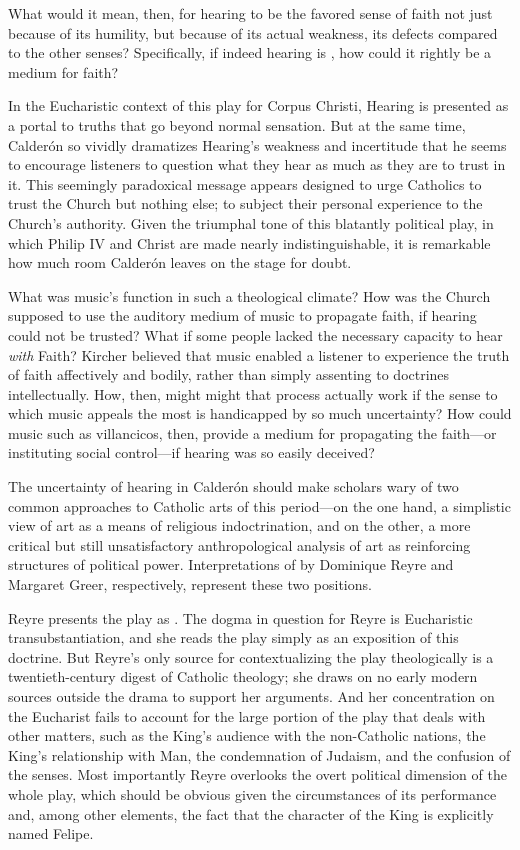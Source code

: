 What would it mean, then, for hearing to be the favored sense of faith not just because of its humility, but because of its actual weakness, its defects compared to the other senses?
Specifically, if indeed hearing is , how could it rightly be a medium for faith?

In the Eucharistic context of this play for Corpus Christi, Hearing is presented as a portal to truths that go beyond normal sensation.
But at the same time, Calderón so vividly dramatizes Hearing's weakness and incertitude that he seems to encourage listeners to question what they hear as much as they are to trust in it.
This seemingly paradoxical message appears designed to urge Catholics to trust the Church but nothing else; to subject their personal experience to the Church's authority.
Given the triumphal tone of this blatantly political play, in which Philip IV and Christ are made nearly indistinguishable, it is remarkable how much room Calderón leaves on the stage for doubt.

What was music's function in such a theological climate?
How was the Church supposed to use the auditory medium of music to propagate faith, if hearing could not be trusted?
What if some people lacked the necessary capacity to hear  \emph{with} Faith?
Kircher believed that music enabled a listener to experience the truth of faith affectively and bodily, rather than simply assenting to doctrines intellectually.
How, then, might might that process actually work if the sense to which music appeals the most is handicapped by so much uncertainty?  
How could music such as villancicos, then, provide a medium for propagating the faith---or instituting social control---if hearing was so easily deceived?

The uncertainty of hearing in Calderón should make scholars wary of two common approaches to Catholic arts of this period---on the one hand, a simplistic view of art as a means of religious indoctrination, and on the other, a more critical but still unsatisfactory anthropological analysis of art as reinforcing structures of political power.
Interpretations of  by Dominique Reyre and Margaret Greer, respectively, represent these two positions.%
  \autocites{Reyre:Retiro}{Greer:Retiro}

Reyre presents the play as .
The dogma in question for Reyre is Eucharistic transubstantiation, and she reads the play simply as an exposition of this doctrine.
But Reyre's only source for contextualizing the play theologically is a twentieth-century digest of Catholic theology; she draws on no early modern sources outside the drama to support her arguments.
And her concentration on the Eucharist fails to account for the large portion of the play that deals with other matters, such as the King's audience with the non-Catholic nations, the King's relationship with Man, the condemnation of Judaism, and the confusion of the senses.
Most importantly Reyre overlooks the overt political dimension of the whole play, which should be obvious given the circumstances of its performance and, among other elements, the fact that the character of the King is explicitly named Felipe.

